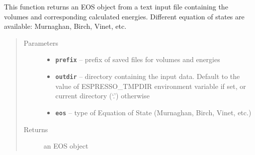 \documentclass[letterpaper,10pt,english]{sphinxmanual}
\begin{document}
\begin{fulllineitems}
\label{postqe:postqe.api.get_eos}
This function returns an EOS object from a text input file containing the volumes
and corresponding calculated energies.
Different equation of states are available: Murnaghan, Birch, Vinet, etc.
\begin{quote}\begin{description}
\item[{Parameters}] \leavevmode\begin{itemize}
\item {} 
\textbf{\texttt{prefix}} -- prefix of saved files for volumes and energies

\item {} 
\textbf{\texttt{outdir}} -- directory containing the input data. Default to the value of     ESPRESSO\_TMPDIR environment variable if set, or current directory (`.') otherwise

\item {} 
\textbf{\texttt{eos}} -- type of Equation of State (Murnaghan, Birch, Vinet, etc.)

\end{itemize}

\item[{Returns}] \leavevmode
an EOS object

\end{description}\end{quote}

\end{fulllineitems}


\begin{fulllineitems}
\label{postqe:postqe.api.get_label}
\end{fulllineitems}

\end{document}
